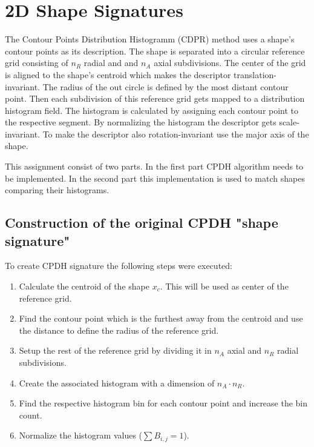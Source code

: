 \chapter{2D Shape Signatures}


The Contour Points Distribution Histogramm (CDPR) method uses  a shape's contour points as its description. The shape is separated into a circular reference grid consisting of $n_R$ radial and and $n_A$ axial subdivisions. The center of the grid is aligned to the shape's centroid which makes the descriptor translation-invariant. The radius of the out circle is defined by the most distant contour point. Then each subdivision of this reference grid gets mapped to a distribution histogram field. The histogram is calculated by assigning each contour point to the respective segment. By normalizing the histogram the descriptor gets scale-invariant. To make the descriptor also rotation-invariant use the major axis of the shape.

This assignment consist of two parts. In the first part CPDH algorithm needs to be implemented. In the second part this implementation is used to match shapes comparing their histograms.

\section{Construction of the original CPDH "shape signature"}
To create CPDH signature the following steps were executed:
\begin{enumerate}
	\item Calculate the centroid of the shape $x_c$. This will be used as center of the reference grid.
	\item Find the contour point which is the furthest away from the centroid and use the distance to define the radius of the reference grid.
	\item Setup the rest of the reference grid by dividing it in $n_A$ axial and $n_R$ radial subdivisions.
	\item Create the associated histogram with a dimension of $n_A \cdot n_R$.
	\item Find the respective histogram bin for each contour point and increase the bin count.
	\item Normalize the histogram values ($\sum B_{i,j} = 1$).
\end{enumerate}

